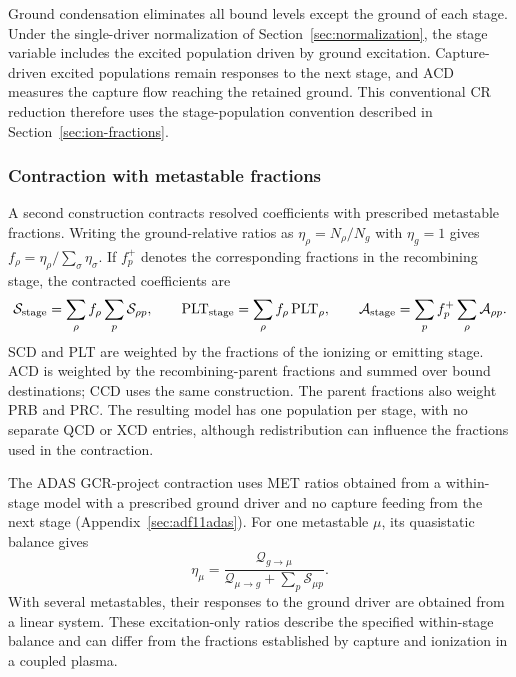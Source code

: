 \documentclass[11pt,a4paper]{article}
\numberwithin{equation}{section}
\begin{document}
Ground condensation eliminates all bound levels except the ground of
each stage. Under the single-driver normalization of
Section~\ref{sec:normalization}, the stage variable includes the
excited population driven by ground excitation. Capture-driven excited
populations remain responses to the next stage, and ACD measures the
capture flow reaching the retained ground. This conventional CR
reduction therefore uses the stage-population convention described in
Section~\ref{sec:ion-fractions}.

\subsubsection{Contraction with metastable fractions}

A second construction contracts resolved coefficients with prescribed
metastable fractions. Writing the ground-relative ratios as
$\eta_\rho=N_\rho/N_g$ with $\eta_g=1$ gives
$f_\rho=\eta_\rho/\sum_\sigma\eta_\sigma$. If $f_p^+$ denotes the
corresponding fractions in the recombining stage, the contracted
coefficients are
\begin{equation}\label{eq:unresolved}
 \mathcal S_{\rm stage}=\sum_\rho f_\rho\sum_p\mathcal S_{\rho p},\qquad
 \mathrm{PLT}_{\rm stage}=\sum_\rho f_\rho\,\mathrm{PLT}_\rho,\qquad
 \mathcal A_{\rm stage}=\sum_p f_p^+\sum_\rho\mathcal A_{\rho p}.
\end{equation}
SCD and PLT are weighted by the fractions of the ionizing or emitting
stage. ACD is weighted by the recombining-parent fractions and summed
over bound destinations; CCD uses the same construction. The parent
fractions also weight PRB and PRC. The resulting model has one
population per stage, with no separate QCD or XCD entries, although
redistribution can influence the fractions used in the contraction.

The ADAS GCR-project contraction uses MET ratios obtained from a
within-stage model with a prescribed ground driver and no capture
feeding from the next stage (Appendix~\ref{sec:adf11adas}). For one
metastable $\mu$, its quasistatic balance gives
\begin{equation}\label{eq:met}
 \eta_\mu=\frac{\mathcal Q_{g\to\mu}}
             {\mathcal Q_{\mu\to g}+\sum_p\mathcal S_{\mu p}}.
\end{equation}
With several metastables, their responses to the ground driver are
obtained from a linear system. These excitation-only ratios describe
the specified within-stage balance and can differ from the fractions
established by capture and ionization in a coupled plasma.
\end{document}

